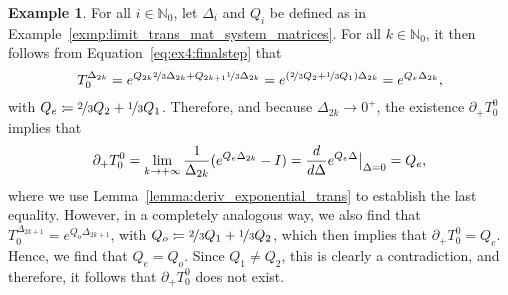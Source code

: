 \documentclass[10pt,a4paper]{paper}
\theoremstyle{definition}
\newtheorem{exmp}{Example}%
\newcommand{\nats}{\mathbb{N}}
\newcommand{\processes}{\mathbb{P}}
\newcommand{\wprocesses}{\processes^{\mathrm{W}}}
\newcommand{\norm}[1]{\left\lVert #1 \right\rVert}
\newcommand{\coloneqq}{:\!=}
\begin{document}
\begin{exmp}
For all $i\in\nats_0$, let $\Delta_i$ and $Q_i$ be defined as in Example~\ref{exmp:limit_trans_mat_system_matrices}. For all $k\in\nats_0$, it then follows from Equation~\eqref{eq:ex4:finalstep} that
\begin{equation*}
T_0^{\Delta_{2k}}
=
e^{Q_{2k}\nicefrac{2}{3}\Delta_{2k}+Q_{2k+1}\nicefrac{1}{3}\Delta_{2k}}
=
e^{(\nicefrac{2}{3}Q_2+\nicefrac{1}{3}Q_1)\Delta_{2k}}
=
e^{Q_e\Delta_{2k}},
\end{equation*}
with $Q_e\coloneqq\nicefrac{2}{3}Q_2+\nicefrac{1}{3}Q_1$. Therefore, and because $\Delta_{2k}\to0^+$, the existence $\partial_{+}{T_{0}^0}$ implies that
\begin{equation*}
\partial_{+}{T_{0}^0}
=\lim_{k\to+\infty}
\frac{1}{\Delta_{2k}}
(e^{Q_e\Delta_{2k}}-I)
={\frac{d}{d \Delta}e^{Q_e\Delta}}\big\vert_{\Delta=0}
=Q_e,
\vspace{6pt}
\end{equation*}
where we use Lemma~\ref{lemma:deriv_exponential_trans} to establish the last equality. However, in a completely analogous way, we also find that $T_0^{\Delta_{2k+1}}=e^{Q_o\Delta_{2k+1}}$, with $Q_o\coloneqq\nicefrac{2}{3}Q_1+\nicefrac{1}{3}Q_2$, which then implies that $\partial_{+}{T_{0}^0}=Q_e$. Hence, we find that $Q_e=Q_o$. Since $Q_1\neq Q_2$, this is clearly a contradiction, and therefore, it follows that $\partial_{+}{T_{0}^0}$ does not exist.

\end{exmp}
\end{document}
